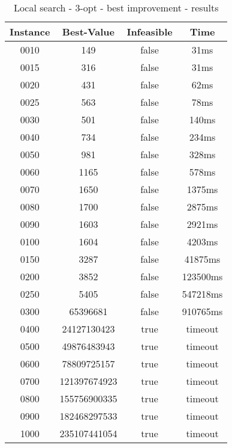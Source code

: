 \begin{table}[H]
	\centering
	\begin{tabular}{|| c | c | c | c ||} 
		\hline
		Instance & Best-Value & Infeasible & Time \\
		\hline\hline
		0010 & 149 & false & 31ms \\
		0015 & 316 & false & 31ms \\
		0020 & 431 & false & 62ms \\
		0025 & 563 & false & 78ms \\
		0030 & 501 & false & 140ms \\
		0040 & 734 & false & 234ms \\
		0050 & 981 & false & 328ms \\
		0060 & 1165 & false & 578ms \\
		0070 & 1650 & false & 1375ms \\
		0080 & 1700 & false & 2875ms \\
		0090 & 1603 & false & 2921ms \\
		0100 & 1604 & false & 4203ms \\
		0150 & 3287 & false & 41875ms \\
		0200 & 3852 & false & 123500ms \\
		0250 & 5405 & false & 547218ms \\
		0300 & 65396681 & false & 910765ms \\
		0400 & 24127130423 & true & timeout \\
		0500 & 49876483943 & true & timeout \\
		0600 & 78809725157 & true & timeout \\
		0700 & 121397674923 & true & timeout \\
		0800 & 155756900335 & true & timeout \\
		0900 & 182468297533 & true & timeout \\
		1000 & 235107441054 & true & timeout \\
		\hline
	\end{tabular}
	\caption{Local search - 3-opt - best improvement - results}
\end{table}

